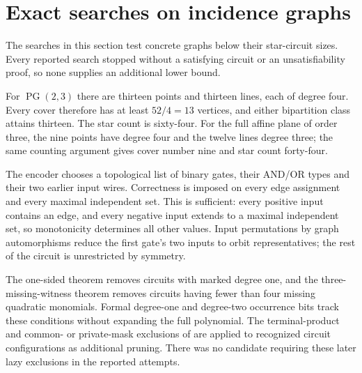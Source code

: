 \section{Exact searches on incidence graphs}
The searches in this section test concrete graphs below their star-circuit sizes. Every reported search stopped without a satisfying circuit or an unsatisfiability proof, so none supplies an additional lower bound.

For $\operatorname{PG}(2,3)$ there are thirteen points and thirteen lines, each of degree four. Every cover therefore has at least $52/4=13$ vertices, and either bipartition class attains thirteen. The star count is sixty-four. For the full affine plane of order three, the nine points have degree four and the twelve lines degree three; the same counting argument gives cover number nine and star count forty-four.

The encoder chooses a topological list of binary gates, their AND/OR types and their two earlier input wires. Correctness is imposed on every edge assignment and every maximal independent set. This is sufficient: every positive input contains an edge, and every negative input extends to a maximal independent set, so monotonicity determines all other values. Input permutations by graph automorphisms reduce the first gate's two inputs to orbit representatives; the rest of the circuit is unrestricted by symmetry.

The one-sided theorem removes circuits with marked degree one, and the three-missing-witness theorem removes circuits having fewer than four missing quadratic monomials. Formal degree-one and degree-two occurrence bits track these conditions without expanding the full polynomial. The terminal-product and common- or private-mask exclusions of \citet[Sections~9--10]{OneSidedCompanion} are applied to recognized circuit configurations as additional pruning. There was no candidate requiring these later lazy exclusions in the reported attempts.

